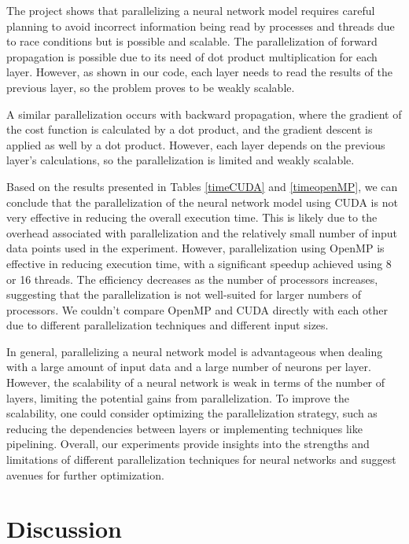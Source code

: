 \documentclass[11pt]{article}
\begin{document}
The project shows that parallelizing a neural network model requires careful planning to avoid incorrect information being read by processes and threads due to race conditions but is possible and scalable. The parallelization of forward propagation is possible due to its need of dot product multiplication for each layer. However, as shown in our code, each layer needs to read the results of the previous layer, so the problem proves to be weakly scalable.

\bigskip

A similar parallelization occurs with backward propagation, where the gradient of the cost function is calculated by a dot product, and the gradient descent is applied as well by a dot product. However, each layer depends on the previous layer's calculations, so the parallelization is limited and weakly scalable.


\bigskip 

Based on the results presented in Tables \ref{timeCUDA} and \ref{timeopenMP}, we can conclude that the parallelization of the neural network model using CUDA is not very effective in reducing the overall execution time. This is likely due to the overhead associated with parallelization and the relatively small number of input data points used in the experiment. However, parallelization using OpenMP is effective in reducing execution time, with a significant speedup achieved using 8 or 16 threads. The efficiency decreases as the number of processors increases, suggesting that the parallelization is not well-suited for larger numbers of processors. We couldn't compare OpenMP and CUDA directly with each other due to different parallelization techniques and different input sizes. 

\bigskip

In general, parallelizing a neural network model is advantageous when dealing with a large amount of input data and a large number of neurons per layer. However, the scalability of a neural network is weak in terms of the number of layers, limiting the potential gains from parallelization. To improve the scalability, one could consider optimizing the parallelization strategy, such as reducing the dependencies between layers or implementing techniques like pipelining. Overall, our experiments provide insights into the strengths and limitations of different parallelization techniques for neural networks and suggest avenues for further optimization.


\section{Discussion}
\end{document}
